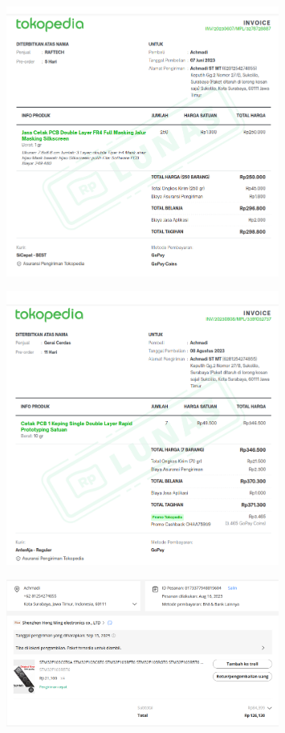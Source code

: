 \documentclass{article} %
\begin{document}
	\begin{figure}[H]
		\centering
		\includegraphics[width=0.8\textwidth]{images/pcb1}
	\end{figure}

	\begin{figure}[H]
		\centering
		\includegraphics[width=0.8\textwidth]{images/pcb0}
	\end{figure}
	
	\begin{figure}[H]
		\centering
		\includegraphics[width=0.8\textwidth]{images/stm32}
	\end{figure}
\end{document}
